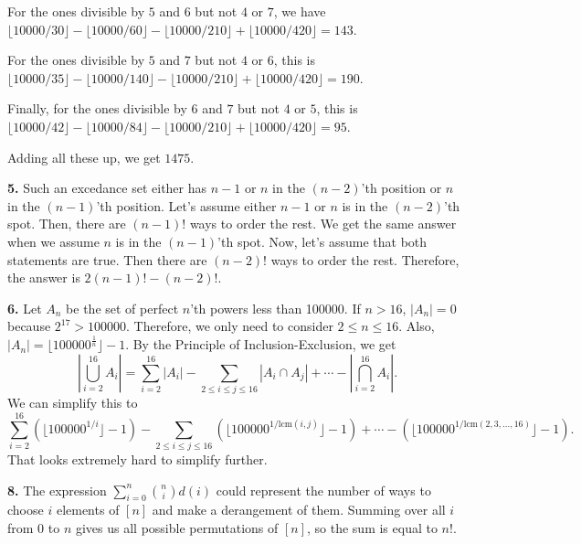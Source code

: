 \documentclass{article}
\begin{document}
For the ones divisible by $5$ and $6$ but not $4$ or $7$, we have $\lfloor 10000/30 \rfloor - \lfloor 10000/60 \rfloor - \lfloor 10000/210 \rfloor + \lfloor 10000/420 \rfloor = 143$.

For the ones divisible by $5$ and $7$ but not $4$ or $6$, this is $\lfloor 10000/35 \rfloor - \lfloor 10000/140 \rfloor - \lfloor 10000/210 \rfloor + \lfloor 10000/420 \rfloor = 190$.

Finally, for the ones divisible by $6$ and $7$ but not $4$ or $5$, this is $\lfloor 10000/42 \rfloor - \lfloor 10000/84 \rfloor - \lfloor 10000/210 \rfloor + \lfloor 10000/420 \rfloor = 95$.
\newline

Adding all these up, we get $1475$.
\newline

\textbf{5.} Such an excedance set either has $n - 1$ or $n$ in the $(n - 2)$'th position or $n$ in the $(n - 1)$'th position. Let's assume either $n - 1$ or $n$ is in the $(n - 2)$'th spot. Then, there are $(n - 1)!$ ways to order the rest. We get the same answer when we assume $n$ is in the $(n - 1)$'th spot. Now, let's assume that both statements are true. Then there are $(n - 2)!$ ways to order the rest. Therefore, the answer is $2(n - 1)! - (n - 2)!$.
\newline

\textbf{6.} Let $A_n$ be the set of perfect $n$'th powers less than 100000. If $n > 16$, $|A_n| = 0$ because $2^{17} > 100000$. Therefore, we only need to consider $2 \le n \le 16$. Also, $|A_n| = \lfloor 100000^{\frac{1}{n}} \rfloor - 1$. By the Principle of Inclusion-Exclusion, we get $$\left|\bigcup_{i = 2}^{16}A_i\right| = \sum_{i = 2}^{16} |A_i| - \sum_{2 \le i \le j \le 16} |A_i \cap A_j| + \cdots - \left|\bigcap_{i = 2}^{16} A_i\right|.$$ We can simplify this to $$\sum_{i = 2}^{16}(\lfloor 100000^{1/i}\rfloor - 1) - \sum_{2\le i\le j\le 16}(\lfloor 100000^{1/\text{lcm}(i, j)}\rfloor - 1) + \cdots - (\lfloor 100000^{1/\text{lcm}(2, 3, \ldots, 16)}\rfloor - 1).$$ That looks extremely hard to simplify further.
\newline

\textbf{8.} The expression $\sum_{i = 0}^n {n\choose i}d(i)$ could represent the number of ways to choose $i$ elements of $[n]$ and make a derangement of them. Summing over all $i$ from $0$ to $n$ gives us all possible permutations of $[n]$, so the sum is equal to $n!$.
\end{document}
